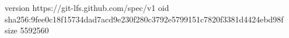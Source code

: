 version https://git-lfs.github.com/spec/v1
oid sha256:9fee0c18f15734dad7acd9e230f280c3792e5799151c7820f3381d4424ebd98f
size 5592560
